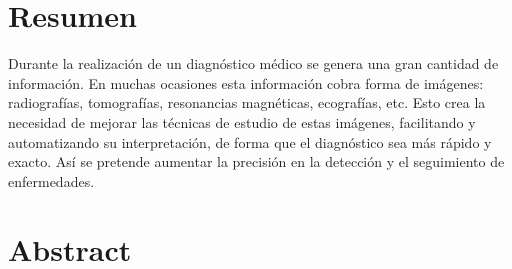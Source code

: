 \section*{Resumen}
Durante la realización de un diagnóstico médico se genera una gran
cantidad de información. En muchas ocasiones esta información cobra
forma de imágenes: radiografías, tomografías, resonancias magnéticas, 
ecografías, etc. Esto crea la necesidad de mejorar las técnicas
de estudio de estas imágenes, facilitando y automatizando su interpretación,
de forma que el diagnóstico sea más rápido y exacto. Así se pretende
aumentar la precisión en la detección y el seguimiento de enfermedades.
\section*{Abstract}

